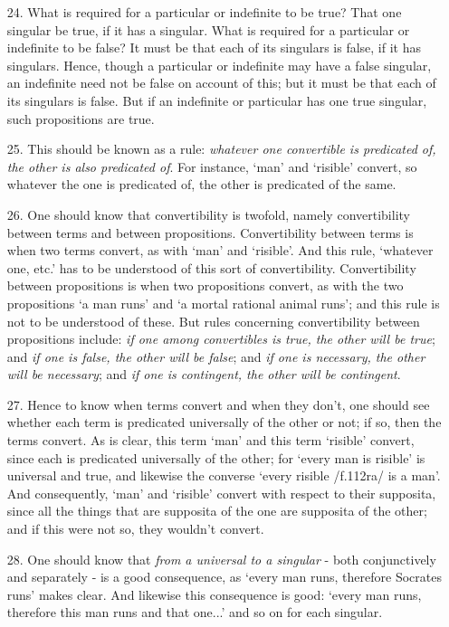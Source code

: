 \documentclass[]{article}
\begin{document}
\begin{enumerate}
\item[24.] What is required for a particular or indefinite to be true? That one singular be true, if it has a singular. What is required for a particular or indefinite to be false? It must be that each of its singulars is false, if it has singulars. Hence, though a particular or indefinite may have a false singular, an indefinite need not be false on account of this; but it must be that each of its singulars is false. But if an indefinite or particular has one true singular, such propositions are true. 
\item[25.] This should be known as a rule: \textit{whatever one convertible is predicated of, the other is also predicated of}. For instance, `man' and `risible' convert, so whatever the one is predicated of, the other is predicated of the same.
\item[26.] One should know that convertibility is twofold, namely convertibility between terms and between propositions. Convertibility between terms is when two terms convert, as with `man' and `risible'. And this rule, `whatever one, etc.' has to be understood of this sort of convertibility. Convertibility between propositions is when two propositions convert, as with the two propositions `a man runs' and `a mortal rational animal runs'; and this rule is not to be understood of these. But rules concerning convertibility between propositions include: \textit{if one among convertibles is true, the other will be true}; and \textit{if one is false, the other will be false}; and \textit{if one is necessary, the other will be necessary}; and \textit{if one is contingent, the other will be contingent}.
\item[27.] Hence to know when terms convert and when they don't, one should see whether each term is predicated universally of the other or not; if so, then the terms convert. As is clear, this term `man' and this term `risible' convert, since each is predicated universally of the other; for `every man is risible' is universal and true, and likewise the converse `every risible /f.112ra/ is a man'. And consequently, `man' and `risible' convert with respect to their supposita, since all the things that are supposita of the one are supposita of the other; and if this were not so, they wouldn't convert.
\item[28.] One should know that \textit{from a universal to a singular} - both conjunctively and separately - is a good consequence, as `every man runs, therefore Socrates runs' makes clear. And likewise this consequence is good: `every man runs, therefore this man runs and that one...' and so on for each singular. 

\end{enumerate}
\end{document}
